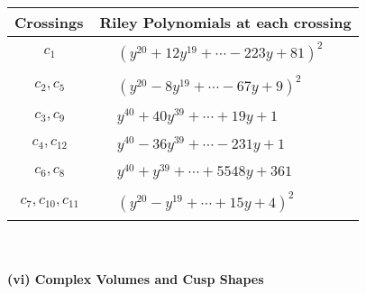 \documentclass[1p]{elsarticle_modified}
\theoremstyle{definition}
\begin{document}
\begin{tabular}{m{50pt}|m{274pt}}
Crossings & \hspace{64pt}Riley Polynomials at each crossing \\
\hline $$\begin{aligned}c_{1}\end{aligned}$$&$\begin{aligned}
&(y^{20}+12 y^{19}+\cdots-223 y+81)^{2}
\end{aligned}$\\
\hline $$\begin{aligned}c_{2},c_{5}\end{aligned}$$&$\begin{aligned}
&(y^{20}-8 y^{19}+\cdots-67 y+9)^{2}
\end{aligned}$\\
\hline $$\begin{aligned}c_{3},c_{9}\end{aligned}$$&$\begin{aligned}
&y^{40}+40 y^{39}+\cdots+19 y+1
\end{aligned}$\\
\hline $$\begin{aligned}c_{4},c_{12}\end{aligned}$$&$\begin{aligned}
&y^{40}-36 y^{39}+\cdots-231 y+1
\end{aligned}$\\
\hline $$\begin{aligned}c_{6},c_{8}\end{aligned}$$&$\begin{aligned}
&y^{40}+y^{39}+\cdots+5548 y+361
\end{aligned}$\\
\hline $$\begin{aligned}c_{7},c_{10},c_{11}\end{aligned}$$&$\begin{aligned}
&(y^{20}- y^{19}+\cdots+15 y+4)^{2}
\end{aligned}$\\
\hline
\end{tabular}\\~\\
\newpage\flushleft \textbf{(vi) Complex Volumes and Cusp Shapes}
\end{document}
